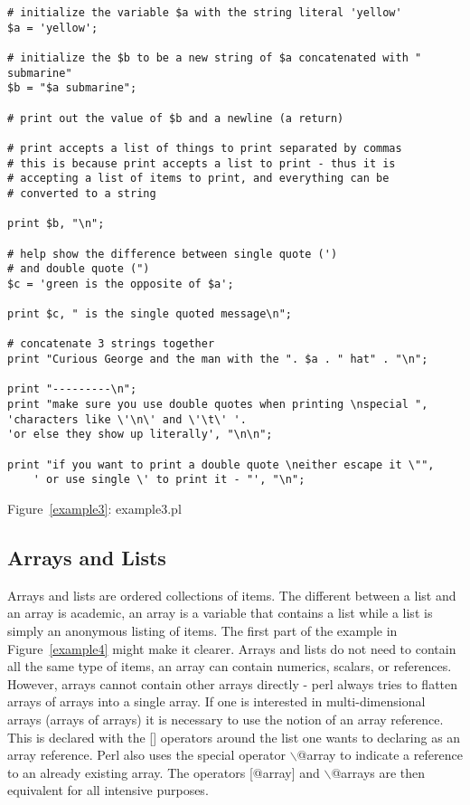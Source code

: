 \documentclass{article}
\begin{document}
\begin{verbatim}
# initialize the variable $a with the string literal 'yellow'
$a = 'yellow';

# initialize the $b to be a new string of $a concatenated with " submarine"
$b = "$a submarine";

# print out the value of $b and a newline (a return)

# print accepts a list of things to print separated by commas
# this is because print accepts a list to print - thus it is 
# accepting a list of items to print, and everything can be 
# converted to a string

print $b, "\n";

# help show the difference between single quote (') 
# and double quote (")
$c = 'green is the opposite of $a';

print $c, " is the single quoted message\n";

# concatenate 3 strings together 
print "Curious George and the man with the ". $a . " hat" . "\n";

print "---------\n";
print "make sure you use double quotes when printing \nspecial ",
'characters like \'\n\' and \'\t\' '.
'or else they show up literally', "\n\n";

print "if you want to print a double quote \neither escape it \"",
    ' or use single \' to print it - "', "\n";

\end{verbatim}
\label{example3}
\begin{center}{Figure~\ref{example3}: example3.pl}\end{center}

\subsection{Arrays and Lists}

Arrays and lists are ordered collections of items.  The different
between a list and an array is academic, an array is a variable that
contains a list while a list is simply an anonymous listing of items.
The first part of the example in Figure~\ref{example4} might make it
clearer.  Arrays and lists do not need to contain all the same type of
items, an array can contain numerics, scalars, or references.
However, arrays cannot contain other arrays directly - perl always tries to
flatten arrays of arrays into a single array.  If one is interested in
multi-dimensional arrays (arrays of arrays) it is necessary to use the
notion of an array reference.  This is declared with the [] operators
around the list one wants to declaring as an array reference.  Perl
also uses the special operator $\backslash$@array to indicate a
reference to an already existing array.  The operators [@array] and
$\backslash$@arrays are then equivalent for all intensive purposes.
\end{document}
